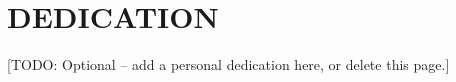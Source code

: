 %
%
%


\chapter*{DEDICATION}

\begin{center}
\vspace*{\fill}
[TODO: Optional -- add a personal dedication here, or delete this page.]
\vspace*{\fill}
\end{center}

\pagebreak{}
